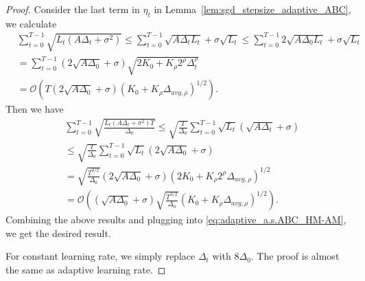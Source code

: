 \documentclass[10pt,a4paper]{amsart}
\newcommand{\Kr}{K_{\rho}}
\newcommand{\paren}[1]{\left( #1 \right)}
\begin{document}
\begin{proof}
    Consider the last term in $\eta_t$ in Lemma~\ref{lem:sgd_stepsize_adaptive_ABC}, we calculate
    \begin{align*}
        &\sum_{t=0}^{T-1} \sqrt{L_t\paren{A\Delta_t+\sigma^2}}
        \leq \sum_{t=0}^{T-1} \sqrt{A\Delta_tL_t}+\sigma\sqrt{L_t}
        \leq
        \sum_{t=0}^{T-1} 2\sqrt{A\Delta_0L_t}+\sigma\sqrt{L_t}\\
        &=\sum_{t=0}^{T-1}\paren{2\sqrt{A\Delta_0}+\sigma}\sqrt{2K_0+\Kr2^\rho\Delta_t^\rho}\\
        &=\mathcal{O}\paren{T\paren{2\sqrt{A\Delta_0}+\sigma}\paren{K_0+\Kr\Delta_{avg,\rho}}^{1/2}}.
    \end{align*}
    Then we have
    \begin{align*}
        &\sum_{t=0}^{T-1}\sqrt{\frac{L_t\paren{A\Delta_t+\sigma^2}T}{\Delta_0}}\leq\sqrt{\frac{T}{\Delta_0}}\sum_{t=0}^{T-1}\sqrt{L_t}\paren{\sqrt{A\Delta_t}+\sigma}\\
        &\leq \sqrt{\frac{T}{\Delta_0}}\sum_{t=0}^{T-1}\sqrt{L_t}\paren{2\sqrt{A\Delta_0}+\sigma}\\
        &=\sqrt{\frac{T^{3/2}}{\Delta_0}}\paren{2\sqrt{A\Delta_0}+\sigma}\paren{2K_0+\Kr2^\rho\Delta_{avg,\rho}}^{1/2}\\
        &=\mathcal{O}\paren{\paren{\sqrt{A\Delta_0}+\sigma}\sqrt{\frac{T^{3/2}}{\Delta_0}}\paren{K_0+\Kr\Delta_{avg,\rho}}^{1/2}}.
    \end{align*}
    Combining the above results and plugging into \eqref{eq:adaptive_a.s.ABC_HM-AM}, we get the desired result.

    For constant learning rate, we simply replace $\Delta_t$ with $8\Delta_0$. 
    The proof is almost the same as adaptive learning rate.

    
\end{proof}
\end{document}

